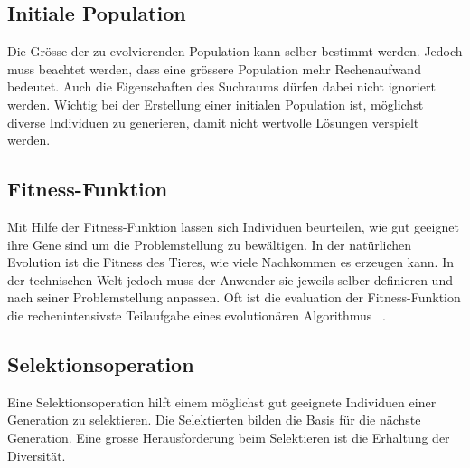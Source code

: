     \subsection{Initiale Population}
      Die Grösse der zu evolvierenden Population kann selber bestimmt werden.
      Jedoch muss beachtet werden, dass eine grössere Population mehr Rechenaufwand bedeutet.
      Auch die Eigenschaften des Suchraums dürfen dabei nicht ignoriert werden.
      Wichtig bei der Erstellung einer initialen Population ist, möglichst diverse Individuen zu generieren,
      damit nicht wertvolle Lösungen verspielt werden.

    \subsection{Fitness-Funktion}

      Mit Hilfe der Fitness-Funktion lassen sich Individuen beurteilen,
      wie gut geeignet ihre Gene sind um die Problemstellung zu bewältigen.
      In der natürlichen Evolution ist die Fitness des Tieres, wie viele Nachkommen es erzeugen kann.
      In der technischen Welt jedoch muss der Anwender sie jeweils selber definieren und
      nach seiner Problemstellung anpassen. Oft ist die evaluation der Fitness-Funktion
      die rechenintensivste Teilaufgabe eines evolutionären Algorithmus ~\cite[S.22]{book:bioInspired}.


    \subsection{Selektionsoperation}

      Eine Selektionsoperation hilft einem möglichst gut geeignete Individuen einer Generation zu selektieren.
      Die Selektierten bilden die Basis für die nächste Generation.
      Eine grosse Herausforderung beim Selektieren ist die Erhaltung der Diversität.

